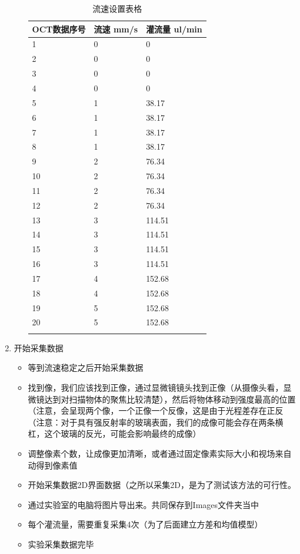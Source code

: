 \documentclass[12pt]{article}
\begin{document}
\begin{enumerate}
\begin{itemize}
       \footnotesize
       \begin{longtable}{@{} p{5cm} p{5cm} p{5cm} @{}}
           \toprule
           \textbf{OCT数据序号} & \textbf{流速 mm/s} & \textbf{灌流量 ul/min} \\ 
           \midrule
           1 & 0 & 0 \\
           2 & 0 & 0 \\
           3 & 0 & 0 \\
           4 & 0 & 0 \\
           5 & 1 & 38.17 \\
           6 & 1 & 38.17 \\
           7 & 1 & 38.17 \\
           8 & 1 & 38.17 \\
           9 & 2 & 76.34 \\
           10 & 2 & 76.34 \\
           11 & 2 & 76.34 \\
           12 & 2 & 76.34 \\
           13 & 3 & 114.51 \\
           14 & 3 & 114.51 \\
           15 & 3 & 114.51 \\
           16 & 3 & 114.51 \\
           17 & 4 & 152.68 \\
           18 & 4 & 152.68 \\
           19 & 5 & 152.68 \\
           20 & 5 & 152.68 \\
           \bottomrule
           \caption{流速设置表格} \\
       \end{longtable}

    
    \end{itemize}

    \item 开始采集数据
    \begin{itemize}
        \item 等到流速稳定之后开始采集数据
        \item 找到像，我们应该找到正像，通过显微镜镜头找到正像（从摄像头看，显微镜达到对扫描物体的聚焦比较清楚），然后将物体移动到强度最高的位置（注意，会呈现两个像，一个正像一个反像，这是由于光程差存在正反
        （注意：对于具有强反射率的玻璃表面，我们的成像可能会存在两条横杠，这个玻璃的反光，可能会影响最终的成像）
        \item 调整像素个数，让成像更加清晰，或者通过固定像素实际大小和视场来自动得到像素值
        \item 开始采集数据2D界面数据（之所以采集2D，是为了测试该方法的可行性。
        \item 通过实验室的电脑将图片导出来。共同保存到Images文件夹当中
        \item 每个灌流量，需要重复采集4次（为了后面建立方差和均值模型）
        \item 实验采集数据完毕
    \end{itemize}


\end{enumerate}
\end{document}
